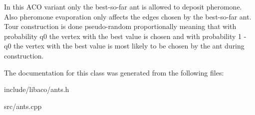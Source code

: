 In this ACO variant only the best-so-far ant is allowed to deposit pheromone. Also pheromone evaporation only affects the edges chosen by the best-so-far ant. Tour construction is done pseudo-random proportionally meaning that with probability q0 the vertex with the best value is chosen and with probability 1 - q0 the vertex with the best value is most likely to be chosen by the ant during construction. 

The documentation for this class was generated from the following files:\begin{CompactItemize}
\item 
include/libaco/ants.h\item 
src/ants.cpp\end{CompactItemize}
